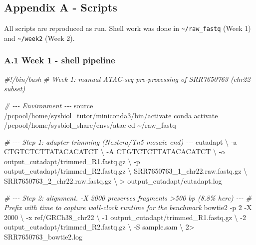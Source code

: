 \documentclass[
  11pt,
  a4paper,
]{article}
\newenvironment{Shaded}{}{}
\newcommand{\AttributeTok}[1]{\textcolor[rgb]{0.49,0.56,0.16}{#1}}
\newcommand{\BuiltInTok}[1]{\textcolor[rgb]{0.00,0.50,0.00}{#1}}
\newcommand{\CommentTok}[1]{\textcolor[rgb]{0.38,0.63,0.69}{\textit{#1}}}
\newcommand{\DataTypeTok}[1]{\textcolor[rgb]{0.56,0.13,0.00}{#1}}
\newcommand{\DecValTok}[1]{\textcolor[rgb]{0.25,0.63,0.44}{#1}}
\newcommand{\ExtensionTok}[1]{#1}
\newcommand{\NormalTok}[1]{#1}
\newcommand{\OperatorTok}[1]{\textcolor[rgb]{0.40,0.40,0.40}{#1}}
\begin{document}
\hypertarget{appendix-a---scripts}{%
\subsection{Appendix A - Scripts}\label{appendix-a---scripts}}

All scripts are reproduced as run. Shell work was done in
\texttt{\textasciitilde{}/raw\_fastq} (Week 1) and
\texttt{\textasciitilde{}/week2} (Week 2).

\hypertarget{a.1-week-1---shell-pipeline}{%
\subsubsection{A.1 Week 1 - shell
pipeline}\label{a.1-week-1---shell-pipeline}}

\begin{Shaded}
\begin{Highlighting}[]
\CommentTok{\#!/bin/bash}
\CommentTok{\# Week 1: manual ATAC{-}seq pre{-}processing of SRR7650763 (chr22 subset)}

\CommentTok{\# {-}{-}{-} Environment {-}{-}{-}}
\BuiltInTok{source}\NormalTok{ /pcpool/home/sysbiol\_tutor/miniconda3/bin/activate}
\ExtensionTok{conda}\NormalTok{ activate /pcpool/home/sysbiol\_share/envs/atac}
\BuiltInTok{cd}\NormalTok{ \textasciitilde{}/raw\_fastq}

\CommentTok{\# {-}{-}{-} Step 1: adapter trimming (Nextera/Tn5 mosaic end) {-}{-}{-}}
\ExtensionTok{cutadapt} \DataTypeTok{\textbackslash{}}
  \AttributeTok{{-}a}\NormalTok{ CTGTCTCTTATACACATCT }\DataTypeTok{\textbackslash{}}
  \AttributeTok{{-}A}\NormalTok{ CTGTCTCTTATACACATCT }\DataTypeTok{\textbackslash{}}
  \AttributeTok{{-}o}\NormalTok{ output\_cutadapt/trimmed\_R1.fastq.gz }\DataTypeTok{\textbackslash{}}
  \AttributeTok{{-}p}\NormalTok{ output\_cutadapt/trimmed\_R2.fastq.gz }\DataTypeTok{\textbackslash{}}
\NormalTok{  SRR7650763\_1\_chr22.raw.fastq.gz }\DataTypeTok{\textbackslash{}}
\NormalTok{  SRR7650763\_2\_chr22.raw.fastq.gz }\DataTypeTok{\textbackslash{}}
  \OperatorTok{\textgreater{}}\NormalTok{ output\_cutadapt/cutadapt.log}

\CommentTok{\# {-}{-}{-} Step 2: alignment. {-}X 2000 preserves fragments \textgreater{}500 bp (8.8\% here) {-}{-}{-}}
\CommentTok{\# Prefix with \textasciigrave{}time\textasciigrave{} to capture wall{-}clock runtime for the benchmark}
\ExtensionTok{bowtie2} \AttributeTok{{-}p}\NormalTok{ 2 }\AttributeTok{{-}X}\NormalTok{ 2000 }\DataTypeTok{\textbackslash{}}
  \AttributeTok{{-}x}\NormalTok{ ref/GRCh38\_chr22 }\DataTypeTok{\textbackslash{}}
  \AttributeTok{{-}1}\NormalTok{ output\_cutadapt/trimmed\_R1.fastq.gz }\DataTypeTok{\textbackslash{}}
  \AttributeTok{{-}2}\NormalTok{ output\_cutadapt/trimmed\_R2.fastq.gz }\DataTypeTok{\textbackslash{}}
  \AttributeTok{{-}S}\NormalTok{ sample.sam }\DataTypeTok{\textbackslash{}}
  \DecValTok{2}\OperatorTok{\textgreater{}}\NormalTok{ SRR7650763\_bowtie2.log}


\end{Highlighting}
\end{Shaded}
\end{document}
